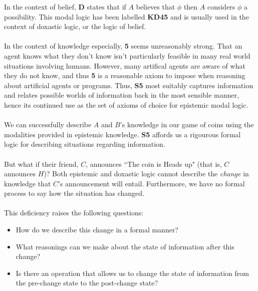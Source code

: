 \documentclass[12pt, a4paper, twoside]{article}
\begin{document}
In the context of belief, {\bf D} states that if $A$ believes that $\phi$ then
$A$ considers $\phi$ a possibility.
This modal logic has been labelled {\bf KD45} and is usually used in the context
of doxastic logic, or the logic of belief.\\
\\
In the context of knowledge especially, {\bf 5} seems unreasonably strong.
That an agent knows what they don't know isn't particularly feasible in many
real world situations involving humans.
However, many artifical agents are aware of what they do not know, and thus
{\bf 5} is a reasonable axiom to impose when reasoning about artificial agents
or programs.
Thus, {\bf S5} most suitably captures information and relates possible
worlds of information back in the most sensible manner, hence its continued use
as the set of axioms of choice for epistemic modal logic. \citep{hoek2008dynamic}\\
\\
We can successfully describe $A$ and $B$'s knowledge in our game of coins using
the modalities provided in epistemic knowledge.
{\bf S5} affords us a rigourous formal logic for describing situations regarding
information.\\
\\
But what if their friend, $C$, announces ``The coin is Heads up" (that is,
$C$ announces $H$)?
Both epistemic and doxastic logic cannot describe the {\em change} in knowledge that
$C$'s announcement will entail.
Furthermore, we have no formal process to say how the situation has changed.\\
\\
This deficiency raises the following questions:
\begin{itemize}
	\item How do we describe this change in a formal manner?
	\item What reasonings can we make about the state of information after this
	change?
	\item Is there an operation that allows us to change the state of information
	from the pre-change state to the post-change state?
\end{itemize}
\end{document}

